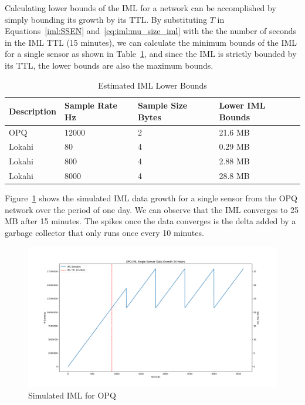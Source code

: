 Calculating lower bounds of the IML for a network can be accomplished by simply bounding its growth by its TTL\@. By substituting $T$ in Equations~\ref{iml:SSEN} and~\ref{eq:iml:mu_size_iml} with the the number of seconds in the IML TTL (15 minutes), we can calculate the minimum bounds of the IML for a single sensor as shown in Table~\ref{table:ttl_a_iml}, and since the IML is strictly bounded by its TTL, the lower bounds are also the maximum bounds.

\begin{table}[H]
	\centering
	\caption{Estimated IML Lower Bounds}
	\begin{tabularx}{\textwidth}{Xlll}
		\toprule
		\textbf{Description} & \textbf{Sample Rate Hz} & \textbf{Sample Size Bytes} & \textbf{Lower IML Bounds} \\
		\midrule
		OPQ & 12000 & 2 & 21.6 MB \\
		Lokahi & 80 & 4 & 0.29 MB \\
		Lokahi & 800 & 4 & 2.88 MB \\
		Lokahi & 8000 & 4 & 28.8 MB \\
		\bottomrule
	\end{tabularx}
	\label{table:ttl_a_iml}
\end{table}

Figure~\ref{fig:sim_iml_opq} shows the simulated IML data growth for a single sensor from the OPQ network over the period of one day. We can observe that the IML converges to 25 MB after 15 minutes. The spikes once the data converges is the delta added by a garbage collector that only runs once every 10 minutes.

\begin{figure}[H]
	\centering
	\includegraphics[width=\linewidth]{figures/sim_iml_opq.png}
	\caption{Simulated IML for OPQ}
	\label{fig:sim_iml_opq}
\end{figure}

